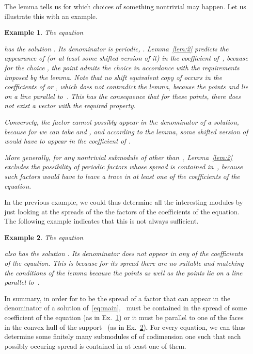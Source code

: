 \documentclass[a4paper]{sig-alternate}
\newtheorem{example}{Example}
\begin{document}
The lemma tells us for which choices of  something nontrivial may happen.
Let us illustrate this with an example.

\begin{example}\label{ex:1}
  The equation
  
  has the solution . Its denominator is periodic, .
  Lemma~\ref{lem:2} predicts the appearance of  (or at least some shifted version of it)
  in the coefficient of~, because for the choice , the point
   admits the choice  in accordance with the requirements imposed
  by the lemma. Note that no shift equivalent copy of  occurs in the coefficients of 
  or , which does not contradict the lemma, because the points  and  lie on
  a line parallel to~. This has the consequence that for these points, there does not exist
  a vector  with the required property.

  Conversely, the factor  cannot possibly appear in the denominator of a solution,
  because for  we can take  and
  , and according to the lemma, some shifted version of 
  would have to appear in the coefficient of .

  More generally, for any nontrivial submodule  of  other than~, Lemma~\ref{lem:2}
  excludes the possibility of periodic factors whose spread is contained in~, because such
  factors would have to leave a trace in at least one of the coefficients of the equation.

  \medskip
  \centerline{}

\end{example}

In the previous example, we could thus determine all the interesting modules  by just looking
at the spreads of the the factors of the coefficients of the equation. The following example
indicates that this is not always sufficient.

\begin{example}\label{ex:2}
  The equation
  
  also has the solution . Its denominator  does not appear in
  any of the coefficients of the equation. This is because for its spread 
  there are no suitable  and  matching the conditions of the
  lemma because the points  as well as the points  lie
  on a line parallel to~.
\end{example}

In summary, in order for  to be the spread of a factor that can appear in the denominator
of a solution of~\eqref{eq:main}, ~must be contained in the spread of some coefficient
of the equation (as in Ex.~\ref{ex:1}) or it must be parallel to one of the faces in the
convex hull of the support~ (as in Ex.~\ref{ex:2}).
For every equation, we can thus determine some finitely many submodules of  of
codimension one such that each possibly occuring spread  is contained in at least one
of them.
\end{document}
